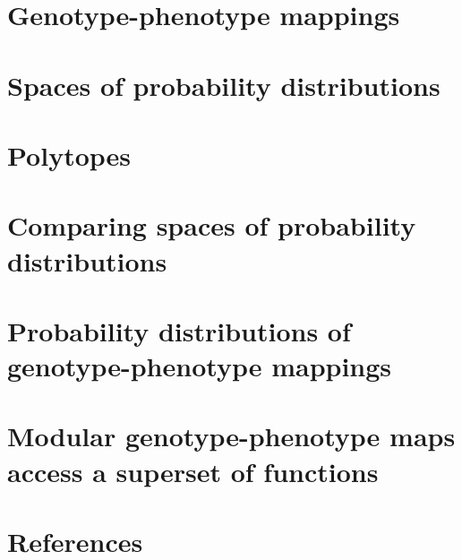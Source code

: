 

%

\newtoggle{thmsty}
\togglefalse{thmsty}

\newtoggle{longpres}
\togglefalse{longpres}









	\begin{frame}
		\titlepage
	\end{frame}
	
	\section[GP maps]{Genotype-phenotype mappings}
	
		
	\section[PD space]{Spaces of probability distributions}
%	
	
	\section{Polytopes}
%		
	
	\section[PD comp]{Comparing spaces of probability distributions}
%	
	
	\section[PDs of GPs]{Probability distributions of genotype-phenotype mappings}
%    
	
	\section[Modular GPs]{Modular genotype-phenotype maps access a superset of functions}
%	
	
%	
	
	\section{References}
	
	
